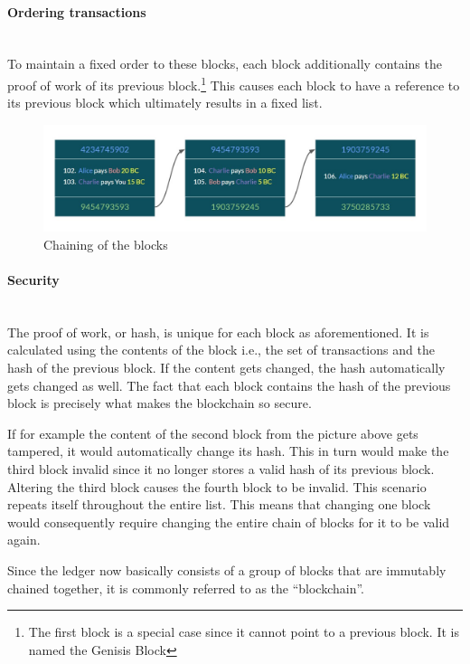 \documentclass[a4paper, 12pt]{report}
\begin{document}
\paragraph{Ordering transactions} \hspace{0pt} \\
To maintain a fixed order to these blocks, each block additionally contains the proof of work of its previous block.\footnote{The first block is a special case since it cannot point to a previous block. It is named the Genisis Block} This causes each block to have a reference to its previous block which ultimately results in a fixed list.

\begin{figure}[h]
	\includegraphics[width=\textwidth]{03_Linked_Blocks}
	\caption{Chaining of the blocks}
	\label{fig:03_Linked_Blocks}
\end{figure}

\paragraph{Security} \hspace{0pt} \\
The proof of work, or hash, is unique for each block as aforementioned. It is calculated using the contents of the block i.e., the set of transactions and the hash of the previous block. If the content gets changed, the hash automatically gets changed as well. The fact that each block contains the hash of the previous block is precisely what makes the blockchain so secure. 
\par If for example the content of the second block from the picture above gets tampered, it would automatically change its hash. This in turn would make the third block invalid since it no longer stores a valid hash of its previous block. Altering the third block causes the fourth block to be invalid. This scenario repeats itself throughout the entire list. This means that changing one block would consequently require changing the entire chain of blocks for it to be valid again. 
\par Since the ledger now basically consists of a group of blocks that are immutably chained together, it is commonly referred to as the “blockchain”. 
\end{document}

